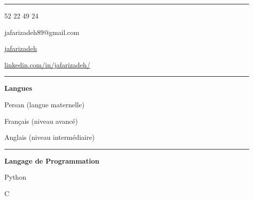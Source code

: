 \documentclass[a4paper]{letter}
\newcommand{\divider}{\rule{\linewidth}{0.9pt}}
\begin{document}
\begin{minipage}[t]{0.40\textwidth}
\setlength{\baselineskip}{1\baselineskip}
\color{white}
\vspace{5mm}




\vspace{5mm}

\divider


\faPhone {} 52 22 49 24

\faEnvelope \quad jafarizadeh89@gmail.com

\faGithub \quad \href{https://github.com/jafarizadeh}{jafarizadeh}

\faLinkedin \quad \href{https://www.linkedin.com/in/jafarizadeh/}{linkedin.com/in/jafarizadeh/}


\divider

{\large \textbf{Langues}}

\faCircleNotch \quad Persan (langue maternelle)

\faCircleNotch \quad Français (niveau avancé)

\faCircleNotch \quad Anglais (niveau intermédiaire)

\divider


{\large \textbf{Langage de Programmation}}

\faCircleNotch \quad Python

\faCircleNotch \quad C


\end{minipage}
\end{document}
